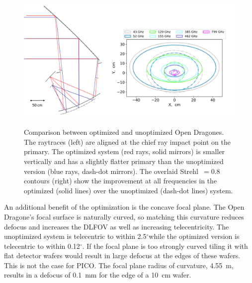 \documentclass[]{spie}  %
\newcommand{\dgr}{$^\circ$}
\begin{document}
\begin{figure} [ht]
\begin{center}
\includegraphics[height=7cm]{jpl_vs_V3D.png}
\end{center}
\caption { \label{fig:compare} 
Comparison between optimized and unoptimized Open Dragones.  The raytraces (left) are aligned at the chief ray impact point on the primary. 
The optimized system (red rays, solid mirrors) is smaller vertically and has a slightly flatter primary than the unoptimized version 
(blue rays, dash-dot mirrors). The overlaid Strehl~$=0.8$ contours (right) show the improvement at 
all frequencies in the optimized (solid lines) over the unoptimized (dash-dot lines) system. 
}
\end{figure} 

An additional benefit of the optimization is the concave focal plane. The Open Dragone's focal surface is naturally curved, so matching this 
curvature reduces defocus and increases the DLFOV as well as increasing telecentricity.  The unoptimized system is telecentric to within 
2.5\dgr while the optimized version is telecentric to within 0.12\dgr. If the focal plane is too strongly curved tiling it with flat detector 
wafers would result in large defocus at the edges of these wafers.  This is not the case for PICO. The focal plane radius of curvature, 4.55~m, 
results in a defocus of 0.1~mm for the edge of a 10~cm wafer. 
\end{document}
